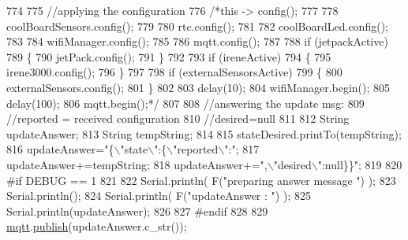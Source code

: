 \begin{DoxyCode}
774 
775             \textcolor{comment}{//applying the configuration    }
776             \textcolor{comment}{/*this -> config();}
777 \textcolor{comment}{}
778 \textcolor{comment}{            coolBoardSensors.config();}
779 \textcolor{comment}{}
780 \textcolor{comment}{            rtc.config();}
781 \textcolor{comment}{}
782 \textcolor{comment}{            coolBoardLed.config();}
783 \textcolor{comment}{            }
784 \textcolor{comment}{            wifiManager.config();}
785 \textcolor{comment}{}
786 \textcolor{comment}{            mqtt.config();}
787 \textcolor{comment}{}
788 \textcolor{comment}{            if (jetpackActive)}
789 \textcolor{comment}{            \{}
790 \textcolor{comment}{                jetPack.config();}
791 \textcolor{comment}{            \}}
792 \textcolor{comment}{}
793 \textcolor{comment}{            if (ireneActive)}
794 \textcolor{comment}{            \{}
795 \textcolor{comment}{                irene3000.config();}
796 \textcolor{comment}{            \}}
797 \textcolor{comment}{}
798 \textcolor{comment}{            if (externalSensorsActive)}
799 \textcolor{comment}{            \{}
800 \textcolor{comment}{                externalSensors.config();}
801 \textcolor{comment}{            \}}
802 \textcolor{comment}{}
803 \textcolor{comment}{            delay(10);}
804 \textcolor{comment}{            wifiManager.begin();}
805 \textcolor{comment}{            delay(100);}
806 \textcolor{comment}{            mqtt.begin();*/}
807 
808                 \textcolor{comment}{//answering the update msg:}
809             \textcolor{comment}{//reported = received configuration}
810             \textcolor{comment}{//desired=null}
811         
812             String updateAnswer;
813             String tempString;
814             
815             stateDesired.printTo(tempString);
816             updateAnswer=\textcolor{stringliteral}{"\{\(\backslash\)"state\(\backslash\)":\{\(\backslash\)"reported\(\backslash\)":"};
817             updateAnswer+=tempString;
818             updateAnswer+=\textcolor{stringliteral}{",\(\backslash\)"desired\(\backslash\)":null\}\}"};
819 
820 \textcolor{preprocessor}{        #if DEBUG == 1}
821 
822             Serial.println( F(\textcolor{stringliteral}{"preparing answer message "}) );
823             Serial.println();
824             Serial.println( F(\textcolor{stringliteral}{"updateAnswer : "}) );
825             Serial.println(updateAnswer);
826         
827 \textcolor{preprocessor}{        #endif  }
828 
829             \hyperlink{classCoolBoard_a2399f44d7c23c1149a335cb3b46d90f1}{mqtt}.\hyperlink{classCoolMQTT_ace977b3e90ab14b1199fe5c4fb0a13ec}{publish}(updateAnswer.c\_str());

\end{DoxyCode}
